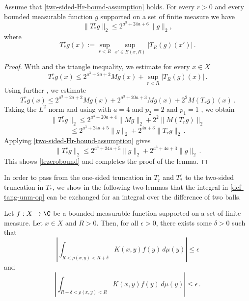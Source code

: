 \begin{lemma}\label{simple-nontangential-operator}
Assume that \eqref{two-sided-Hr-bound-assumption} holds.
For every  $r>0$ and every bounded measurable function $g$ supported on a set of finite measure we have
\begin{equation}\label{trzerobound}
    \|T_{*}^rg\|_2\le 2^{a^3+24a+6}\|g\|_2,
\end{equation}
where
\begin{equation}\label{eq-simple--nontangential}
    T_{*}^r g(x):=\sup_{r<R}\sup_{x'\in B(x,R)} |T_R(g)(x')| \, .
\end{equation}
\end{lemma}
\begin{proof}
With  and the triangle inequality, we estimate for every $x\in X$
\begin{equation}
     T_{*}^r g(x)
     \le 2^{a^3 + 2a + 2} Mg(x)+\sup_{r<R} |T_R(g)(x)|\, .
\end{equation}
Using further , we estimate
\begin{equation}
      T_{*}^r g(x)
     \le 2^{a^3+2a+2}Mg(x) + 2^{a^3+20a+3}Mg(x) + 2^{2}M(T_rg)(x)\, .
\end{equation}
Taking the $L^2$ norm and using  with $a=4$  and $p_2=2$ and $p_1=1$ , we obtain
\begin{equation}
      \|T_{*}^r g\|_2
     \le 2^{a^3+20a+4} \|Mg\|_2 + 2^{2}\|M(T_rg)\|_2
\end{equation}
\begin{equation}
     \le 2^{a^3+24a+5} \|g\|_2 + 2^{4a+3}\|T_r g\|_2\, .
\end{equation}
Applying \eqref{two-sided-Hr-bound-assumption} gives
\begin{equation}
      \|T_{*}^r g\|_2\le 2^{a^3+24a+5}\|g\|_2 + 2^{a^3+4a+3}\|g\|_2\, .
\end{equation}
This shows \eqref{trzerobound} and completes the proof of the lemma.
\end{proof}
In order to pass from the one-sided truncation in $T_r$ and $T_{*}^r$ to the two-sided truncation in $T_*$, we show in the following two lemmas that the integral in \eqref{def-tang-unm-op} can be exchanged for an integral over the difference of two balls.
\begin{lemma} \label{small-annulus}
    Let $f:X\to\C$ be a bounded measurable function supported on a set of finite measure.
    Let $x\in X$ and $R>0$.
    Then, for all $\epsilon>0$, there exists some $\delta>0$ such that
    \begin{equation}
        \left| \int_{R<\rho(x,y)<R+\delta} K(x,y) f(y) \, d\mu(y) \right| \le \epsilon
    \end{equation}
    and
    \begin{equation}
        \left| \int_{R-\delta<\rho(x,y)<R} K(x,y) f(y) \, d\mu(y) \right| \le \epsilon \,.
    \end{equation}
\end{lemma}
